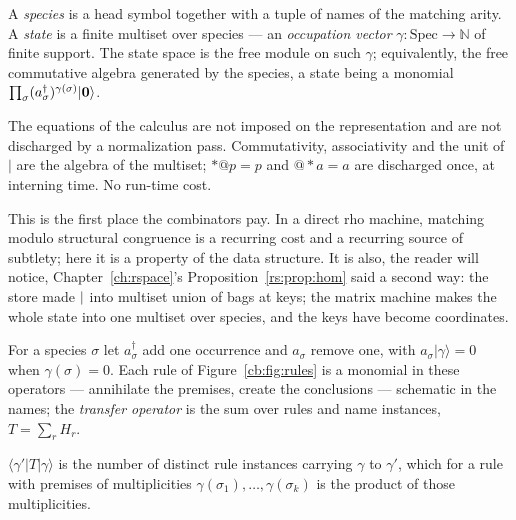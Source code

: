 \begin{definition}
\label{cb:def:species}
A \emph{species} is a head symbol together with a tuple of names of the matching arity. A
\emph{state} is a finite multiset over species --- an \emph{occupation vector}
$\gamma : \mathrm{Spec} \to \mathbb{N}$ of finite support. The state space is the free
module on such $\gamma$; equivalently, the free commutative algebra generated by the
species, a state being a monomial $\prod_\sigma (a^{\dagger}_\sigma)^{\gamma(\sigma)}
\lvert\mathbf{0}\rangle$.
\end{definition}

\begin{principle}
\label{cb:prin:free}
The equations of the calculus are not imposed on the representation and are not discharged
by a normalization pass. Commutativity, associativity and the unit of $\mid$ are the
algebra of the multiset; $*@p = p$ and $@*a = a$ are discharged once, at interning time.
No run-time cost.
\end{principle}

This is the first place the combinators pay. In a direct rho machine, matching modulo
structural congruence is a recurring cost and a recurring source of subtlety; here it is
a property of the data structure. It is also, the reader will notice, Chapter~\ref{ch:rspace}'s
Proposition~\ref{rs:prop:hom} said a second way: the store made $\mid$ into multiset union
of bags at keys; the matrix machine makes the whole state into one multiset over species,
and the keys have become coordinates.

\begin{definition}
\label{cb:def:operator}
For a species $\sigma$ let $a^{\dagger}_\sigma$ add one occurrence and $a_\sigma$ remove
one, with $a_\sigma \lvert\gamma\rangle = 0$ when $\gamma(\sigma) = 0$. Each rule of
Figure~\ref{cb:fig:rules} is a monomial in these operators --- annihilate the premises,
create the conclusions --- schematic in the names; the \emph{transfer operator} is the sum
over rules and name instances, $T = \sum_r H_r$.
\end{definition}

\begin{proposition}
\label{cb:prop:massaction}
$\langle\gamma'\lvert T \rvert\gamma\rangle$ is the number of distinct rule instances
carrying $\gamma$ to $\gamma'$, which for a rule with premises of multiplicities
$\gamma(\sigma_1),\dots,\gamma(\sigma_k)$ is the product of those multiplicities.
\end{proposition}

